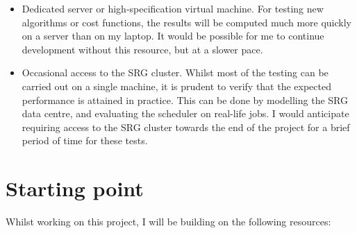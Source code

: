 \begin{itemize}
  \item Dedicated server or high-specification virtual machine. For testing new algorithms or cost functions, the results will be computed much more quickly on a server than on my laptop. It would be possible for me to continue development without this resource, but at a slower pace.
  \item Occasional access to the SRG cluster. Whilst most of the testing can be carried out on a single machine, it is prudent to verify that the expected performance is attained in practice. This can be done by modelling the SRG data centre, and evaluating the scheduler on real-life jobs. I would anticipate requiring access to the SRG cluster towards the end of the project for a brief period of time for these tests.
\end{itemize}

\section*{Starting point}
Whilst working on this project, I will be building on the following resources:

